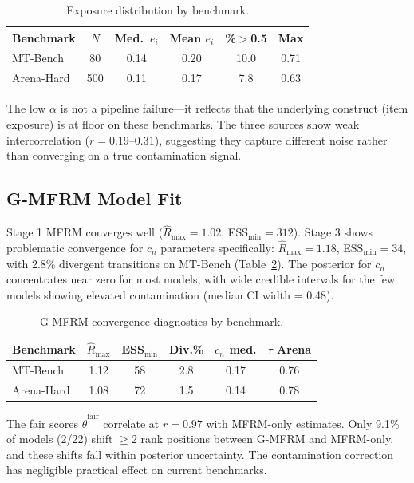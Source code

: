 \documentclass[11pt]{article}
\begin{document}
\begin{table}[t]
\centering
\small
\caption{Exposure distribution by benchmark.}
\label{tab:exposure_bench}
\begin{tabular}{lccccc}
\toprule
\textbf{Benchmark} & \textbf{$N$} & \textbf{Med.\ $e_i$} & \textbf{Mean $e_i$} & \textbf{\%${>}$0.5} & \textbf{Max} \\
\midrule
MT-Bench & 80 & 0.14 & 0.20 & 10.0 & 0.71 \\
Arena-Hard & 500 & 0.11 & 0.17 & 7.8 & 0.63 \\
\bottomrule
\end{tabular}
\end{table}

The low $\alpha$ is not a pipeline failure---it reflects that the underlying construct (item exposure) is at floor on these benchmarks.
The three sources show weak intercorrelation ($r = 0.19$--$0.31$), suggesting they capture different noise rather than converging on a true contamination signal.

\subsection{G-MFRM Model Fit}
\label{sec:fit}

Stage 1 MFRM converges well ($\hat{R}_{\max} = 1.02$, ESS${}_{\min} = 312$).
Stage 3 shows problematic convergence for $c_n$ parameters specifically: $\hat{R}_{\max} = 1.18$, ESS${}_{\min} = 34$, with 2.8\% divergent transitions on MT-Bench (Table~\ref{tab:fit}).
The posterior for $c_n$ concentrates near zero for most models, with wide credible intervals for the few models showing elevated contamination (median CI width = 0.48).

\begin{table}[t]
\centering
\small
\caption{G-MFRM convergence diagnostics by benchmark.}
\label{tab:fit}
\begin{tabular}{lccccc}
\toprule
\textbf{Benchmark} & $\hat{R}_{\max}$ & \textbf{ESS}${}_{\min}$ & \textbf{Div.\%} & \textbf{$c_n$ med.} & \textbf{$\tau$ Arena} \\
\midrule
MT-Bench & 1.12 & 58 & 2.8 & 0.17 & 0.76 \\
Arena-Hard & 1.08 & 72 & 1.5 & 0.14 & 0.78 \\
\bottomrule
\end{tabular}
\end{table}

The fair scores $\hat{\theta}^{\text{fair}}$ correlate at $r = 0.97$ with MFRM-only estimates.
Only 9.1\% of models (2/22) shift $\geq$2 rank positions between G-MFRM and MFRM-only, and these shifts fall within posterior uncertainty.
The contamination correction has negligible practical effect on current benchmarks.
\end{document}
